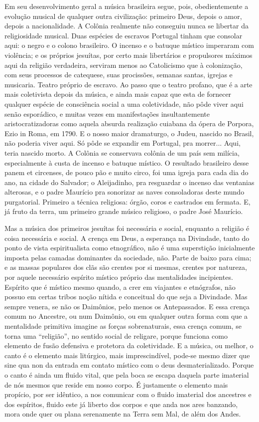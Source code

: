 Em seu desenvolvimento geral a música brasileira segue, pois,
obedientemente a evolução musical de qualquer outra civilização:
primeiro Deus, depois o amor, depois a nacionalidade. A Colônia
realmente não conseguiu nunca se libertar da religiosidade musical. Duas
espécies de escravos Portugal tinham que consolar aqui: o negro e o
colono brasileiro. O incenso e o batuque místico imperaram com
violência; e os próprios jesuítas, por certo mais libertários e
propulsores máximos aqui da religião verdadeira, serviram menos ao
Catolicismo que à colonização, com seus processos de catequese, suas
procissões, semanas santas, igrejas e musicaria. Teatro próprio de
escravo. Ao passo que o teatro profano, que é a arte mais coletivista
depois da música, e ainda mais capaz que esta de fornecer qualquer
espécie de consciência social a uma coletividade, não pôde viver aqui
senão esporádico, e muitas vezes em manifestações insultantemente
aristocratizadoras como aquela absurda realização cuiabana da ópera de
Porpora, Ezio in Roma, em 1790. E o nosso maior dramaturgo, o Judeu,
nascido no Brasil, não poderia viver aqui. Só pôde se expandir em
Portugal, pra morrer... Aqui, teria nascido morto. A Colônia se
conservava colônia de um país sem milícia, especialmente à custa de
incenso e batuque místico. O resultado brasileiro desse panem et
circenses, de pouco pão e muito circo, foi uma igreja para cada dia do
ano, na cidade do Salvador; o Aleijadinho, pra resguardar o incenso das
ventanias alterosas, e o padre Maurício pra sonorizar as naves
consoladoras deste mundo purgatorial. Primeiro a técnica religiosa:
órgão, coros e castrados em fermata. E, já fruto da terra, um primeiro
grande músico religioso, o padre José Maurício.

Mas a música dos primeiros jesuítas foi necessária e social, enquanto a
religião é coisa necessária e social. A crença em Deus, a esperança na
Divindade, tanto do ponto de vista espiritualista como etnográfico, não
é uma superstição inicialmente imposta pelas camadas dominantes da
sociedade, não. Parte de baixo para cima; e as massas populares dos clãs
são crentes por si mesmas, crentes por natureza, por aquele necessário
espírito místico próprio das mentalidades incipientes. Espírito que é
místico mesmo quando, a crer em viajantes e etnógrafos, não possuo em
certas tribos noção nítida e conceitual do que seja a Divindade. Mas
sempre venera, se não os Daimônios, pelo menos os Antepassados. E essa
crença comum no Ancestre, ou num Daimônio, ou em qualquer outra forma
com que a mentalidade primitiva imagine as forças sobrenaturais, essa
crença comum, se torna uma ``religião'', no sentido social de religare,
porque funciona como elemento de fusão defensiva e protetora da
coletividade. E a música, ou melhor, o canto é o elemento mais
litúrgico, mais imprescindível, pode-se mesmo dizer que sine qua non da
entrada em contato místico com o deus desmaterializado. Porque o canto é
ainda um fluido vital, que pela boca se escapa daquela parte imaterial
de nós mesmos que reside em nosso corpo. É justamente o elemento mais
propício, por ser idêntico, a nos comunicar com o fluido imaterial dos
ancestres e dos espíritos, fluido este já liberto dos corpos e que anda
nos ares banzando, mora onde quer ou plana serenamente na Terra sem Mal,
de além dos Andes.

